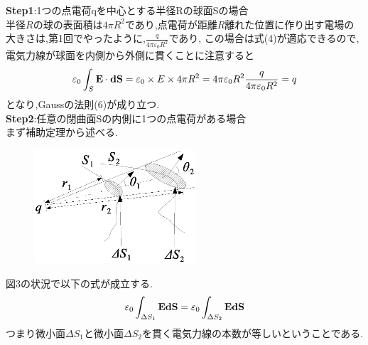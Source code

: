 \documentclass{jsarticle}
\begin{document}
\noindent
{\bf Step1}:1つの点電荷qを中心とする半径Rの球面Sの場合 \\
半径$R$の球の表面積は$4 \pi R^{2}$であり,点電荷が距離$R$離れた位置に作り出す電場の大きさは,第1回でやったように,$\frac{q}{4\pi \varepsilon_0 R^2}$であり,
この場合は式(4)が適応できるので,電気力線が球面を内側から外側に貫くことに注意すると
\begin{equation}
\varepsilon_0 \int_{S}^{} {\bf E} \cdot {\bf dS}=\varepsilon_0 \times E \times 4\pi R^2 = 4 \pi \varepsilon_0 R^2 \frac{q}{4\pi \varepsilon_0 R^2}=q
\end{equation}
となり,Gaussの法則(6)が成り立つ.\\

\noindent
{\bf Step2}:任意の閉曲面Sの内側に1つの点電荷がある場合 \\
まず補助定理から述べる.
\begin{figure}[htbp]
 \begin{center}
  \includegraphics[width=60mm]{2.3.eps}
 \end{center}
 \caption{}
 \label{fig:one}
\end{figure}
図3の状況で以下の式が成立する.
\begin{equation}
\varepsilon_0 \int_{\Delta S_1}^{}{\bf E}{\bf dS} =\varepsilon_0 \int_{\Delta S_2}^{}{\bf E}{\bf dS}
\end{equation}
つまり微小面$\Delta S_1$と微小面$\Delta S_2$を貫く電気力線の本数が等しいということである.\\
\end{document}
